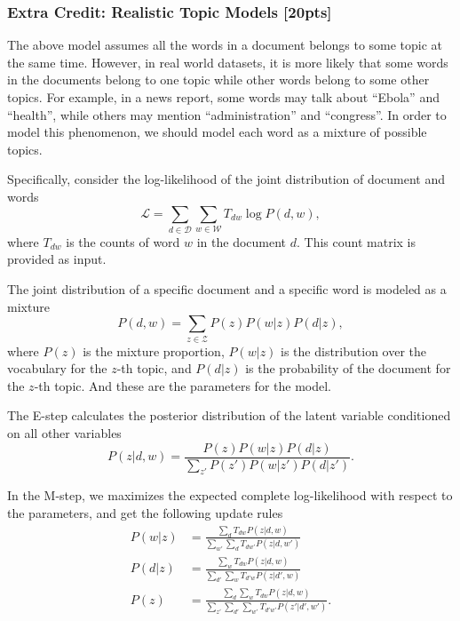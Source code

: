 \documentclass[twoside,10pt]{article}
\begin{document}
\subsubsection*{Extra Credit: Realistic Topic Models [20pts]}
The above model assumes all the words in a document belongs to some topic at the same time. However, in real world datasets, it is more likely that
some words in the documents belong to one topic while other words belong to some other topics. For example, in a news report, some words may talk about ``Ebola'' and ``health'', while others may mention ``administration'' and ``congress''. In order to model this phenomenon, we should model each word as a mixture of possible topics.

Specifically, consider the log-likelihood of the joint distribution of document and words
\begin{equation}
\mathcal{L} = \sum_{d\in \mathcal{D}}\sum_{w \in \mathcal{W}} T_{dw} \log P(d, w),
\end{equation}
where $T_{dw}$ is the counts of word $w$ in the document $d$. This count matrix is provided as input.

The joint distribution of a specific document and a specific word is modeled as a mixture
\begin{equation}
P(d, w) = \sum_{z \in \mathcal{Z}} P(z) P(w|z) P(d|z),
\end{equation}
where $P(z)$ is the mixture proportion, $P(w|z)$ is the distribution over the vocabulary for the $z$-th topic, and $P(d|z)$ is the probability of the document for the $z$-th topic. And these are the parameters for the model.

The E-step calculates the posterior distribution of the latent variable conditioned on all other variables
\begin{equation}
P(z|d, w) = \frac{P(z) P(w|z) P(d|z)}{\sum_{z'}P(z') P(w|z') P(d|z')}.
\end{equation}

In the M-step, we maximizes the expected complete log-likelihood with respect to the parameters, and get the following update rules
\begin{align}
P(w|z) &= \frac{\sum_{d} T_{dw} P(z|d,w)}{\sum_{w'}\sum_{d} T_{dw'} P(z|d,w')} \\
P(d|z) &=  \frac{\sum_{w} T_{dw} P(z|d,w)}{\sum_{d'}\sum_{w} T_{d'w} P(z|d',w)} \\
P(z) &= \frac{\sum_{d}\sum_{w} T_{dw} P(z|d,w)}{\sum_{z'}\sum_{d'}\sum_{w'} T_{d'w'} P(z'|d',w')} .
\end{align}
\end{document}
